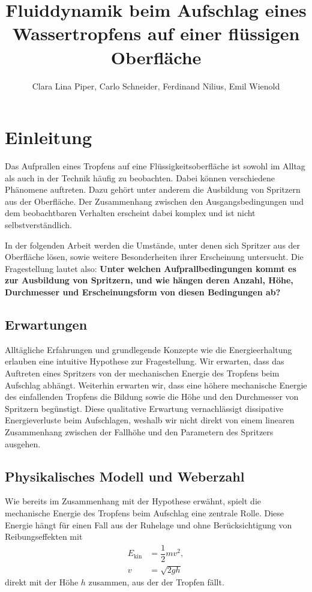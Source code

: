 \documentclass[twocolumn,10pt]{extarticle}
\title{\textbf{Fluiddynamik beim Aufschlag eines Wassertropfens auf einer flüssigen Oberfläche}}
\author{Clara Lina Piper, Carlo Schneider, Ferdinand Nilius, Emil Wienold}
\date{}
\begin{document}
\twocolumn[
\begin{@twocolumnfalse}
\maketitle
\end{@twocolumnfalse}
]

\section{Einleitung}
Das Aufprallen eines Tropfens auf eine Flüssigkeitsoberfläche ist sowohl im Alltag als auch in der Technik häufig zu beobachten. Dabei können verschiedene Phänomene auftreten. Dazu gehört unter anderem die Ausbildung von Spritzern aus der Oberfläche. Der Zusammenhang zwischen den Ausgangsbedingungen und dem beobachtbaren Verhalten erscheint dabei komplex und ist nicht selbstverständlich.\newline

In der folgenden Arbeit werden die Umstände, unter denen sich Spritzer aus der Oberfläche lösen, sowie weitere Besonderheiten ihrer Erscheinung untersucht. Die Fragestellung lautet also: \textbf{Unter welchen Aufprallbedingungen kommt es zur Ausbildung von Spritzern, und wie hängen deren Anzahl, Höhe, Durchmesser und Erscheinungsform von diesen Bedingungen ab?}

\subsection{Erwartungen}
Alltägliche Erfahrungen und grundlegende Konzepte wie die Energieerhaltung erlauben eine intuitive Hypothese zur Fragestellung. Wir erwarten, dass das Auftreten eines Spritzers von der mechanischen Energie des Tropfens beim Aufschlag abhängt. Weiterhin erwarten wir, dass eine höhere mechanische Energie des einfallenden Tropfens die Bildung sowie die Höhe und den Durchmesser von Spritzern begünstigt. Diese qualitative Erwartung vernachlässigt dissipative Energieverluste beim Aufschlagen, weshalb wir nicht direkt von einem linearen Zusammenhang zwischen der Fallhöhe und den Parametern des Spritzers ausgehen.

\subsection{Physikalisches Modell und Weberzahl}
Wie bereits im Zusammenhang mit der Hypothese erwähnt, spielt die mechanische Energie des Tropfens beim Aufschlag eine zentrale Rolle. Diese Energie hängt für einen Fall aus der Ruhelage und ohne Berücksichtigung von Reibungseffekten mit
\begin{align*}
E_\text{kin}&=\dfrac{1}{2}mv^2, \\
v&=\sqrt{2gh}
\end{align*}
direkt mit der Höhe $h$ zusammen, aus der der Tropfen fällt.
\newline
\end{document}
